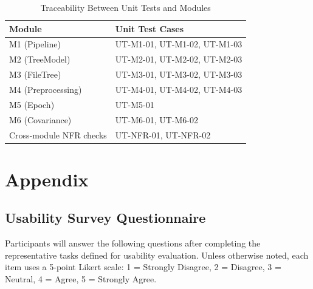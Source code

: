 \documentclass[12pt, titlepage]{article}
\begin{document}
\begin{table}[h]
\centering
\begin{tabularx}{0.9\textwidth}{p{2.2cm}X}
\toprule
    \textbf{Module} & \textbf{Unit Test Cases} \\
\midrule
    M1 (Pipeline) & UT-M1-01, UT-M1-02, UT-M1-03 \\
    M2 (TreeModel) & UT-M2-01, UT-M2-02, UT-M2-03 \\
    M3 (FileTree) & UT-M3-01, UT-M3-02, UT-M3-03 \\
    M4 (Preprocessing) & UT-M4-01, UT-M4-02, UT-M4-03 \\
    M5 (Epoch) & UT-M5-01 \\
    M6 (Covariance) & UT-M6-01, UT-M6-02 \\
    Cross-module NFR checks & UT-NFR-01, UT-NFR-02 \\
\bottomrule
\end{tabularx}
\caption{Traceability Between Unit Tests and Modules}
\end{table}
\newpage














\newpage








\section{Appendix}


\subsection{Usability Survey Questionnaire}
 \label{sec_usability_survey_questionnaire}

Participants will answer the following questions after completing the representative tasks defined for usability evaluation. Unless otherwise noted, each item uses a 5-point Likert scale: 1 = Strongly Disagree, 2 = Disagree, 3 = Neutral, 4 = Agree, 5 = Strongly Agree.
\end{document}
